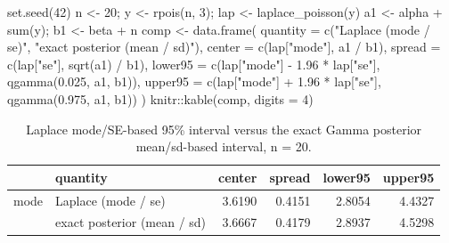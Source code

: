\documentclass[
  letterpaper,
  DIV=11,
  numbers=noendperiod]{scrreprt}
\newenvironment{Shaded}{\begin{snugshade}}{\end{snugshade}}
\newcommand{\AttributeTok}[1]{\textcolor[rgb]{0.40,0.45,0.13}{#1}}
\newcommand{\DecValTok}[1]{\textcolor[rgb]{0.68,0.00,0.00}{#1}}
\newcommand{\FloatTok}[1]{\textcolor[rgb]{0.68,0.00,0.00}{#1}}
\newcommand{\FunctionTok}[1]{\textcolor[rgb]{0.28,0.35,0.67}{#1}}
\newcommand{\NormalTok}[1]{\textcolor[rgb]{0.00,0.23,0.31}{#1}}
\newcommand{\OtherTok}[1]{\textcolor[rgb]{0.00,0.23,0.31}{#1}}
\newcommand{\SpecialCharTok}[1]{\textcolor[rgb]{0.37,0.37,0.37}{#1}}
\newcommand{\StringTok}[1]{\textcolor[rgb]{0.13,0.47,0.30}{#1}}
\begin{document}
\begin{Shaded}
\begin{Highlighting}[]
\FunctionTok{set.seed}\NormalTok{(}\DecValTok{42}\NormalTok{)}
\NormalTok{n }\OtherTok{\textless{}{-}} \DecValTok{20}\NormalTok{; y }\OtherTok{\textless{}{-}} \FunctionTok{rpois}\NormalTok{(n, }\DecValTok{3}\NormalTok{); lap }\OtherTok{\textless{}{-}} \FunctionTok{laplace\_poisson}\NormalTok{(y)}
\NormalTok{a1 }\OtherTok{\textless{}{-}}\NormalTok{ alpha }\SpecialCharTok{+} \FunctionTok{sum}\NormalTok{(y); b1 }\OtherTok{\textless{}{-}}\NormalTok{ beta }\SpecialCharTok{+}\NormalTok{ n}
\NormalTok{comp }\OtherTok{\textless{}{-}} \FunctionTok{data.frame}\NormalTok{(}
  \AttributeTok{quantity =} \FunctionTok{c}\NormalTok{(}\StringTok{"Laplace (mode / se)"}\NormalTok{, }\StringTok{"exact posterior (mean / sd)"}\NormalTok{),}
  \AttributeTok{center =} \FunctionTok{c}\NormalTok{(lap[}\StringTok{"mode"}\NormalTok{], a1 }\SpecialCharTok{/}\NormalTok{ b1),}
  \AttributeTok{spread =} \FunctionTok{c}\NormalTok{(lap[}\StringTok{"se"}\NormalTok{], }\FunctionTok{sqrt}\NormalTok{(a1) }\SpecialCharTok{/}\NormalTok{ b1),}
  \AttributeTok{lower95 =} \FunctionTok{c}\NormalTok{(lap[}\StringTok{"mode"}\NormalTok{] }\SpecialCharTok{{-}} \FloatTok{1.96} \SpecialCharTok{*}\NormalTok{ lap[}\StringTok{"se"}\NormalTok{], }\FunctionTok{qgamma}\NormalTok{(}\FloatTok{0.025}\NormalTok{, a1, b1)),}
  \AttributeTok{upper95 =} \FunctionTok{c}\NormalTok{(lap[}\StringTok{"mode"}\NormalTok{] }\SpecialCharTok{+} \FloatTok{1.96} \SpecialCharTok{*}\NormalTok{ lap[}\StringTok{"se"}\NormalTok{], }\FunctionTok{qgamma}\NormalTok{(}\FloatTok{0.975}\NormalTok{, a1, b1))}
\NormalTok{)}
\NormalTok{knitr}\SpecialCharTok{::}\FunctionTok{kable}\NormalTok{(comp, }\AttributeTok{digits =} \DecValTok{4}\NormalTok{)}
\end{Highlighting}
\end{Shaded}

{

\begin{longtable}[]{@{}llrrrr@{}}

\caption{\label{tbl-poisson-gamma-ci}Laplace mode/SE-based 95\% interval
versus the exact Gamma posterior mean/sd-based interval, n = 20.}

\tabularnewline

\toprule\noalign{}
& quantity & center & spread & lower95 & upper95 \\
\midrule\noalign{}
\endhead
\bottomrule\noalign{}
\endlastfoot
mode & Laplace (mode / se) & 3.6190 & 0.4151 & 2.8054 & 4.4327 \\
& exact posterior (mean / sd) & 3.6667 & 0.4179 & 2.8937 & 4.5298 \\

\end{longtable}

}
\end{document}
